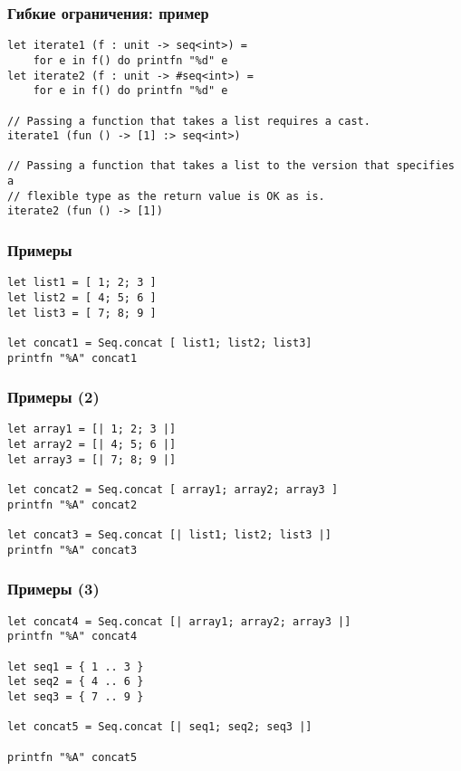 \documentclass{../../slides-style}
\begin{document}
    \begin{frame}[fragile]
        \frametitle{Гибкие ограничения: пример}
        \begin{verbatim}
let iterate1 (f : unit -> seq<int>) =
    for e in f() do printfn "%d" e
let iterate2 (f : unit -> #seq<int>) =
    for e in f() do printfn "%d" e

// Passing a function that takes a list requires a cast.
iterate1 (fun () -> [1] :> seq<int>)

// Passing a function that takes a list to the version that specifies a
// flexible type as the return value is OK as is.
iterate2 (fun () -> [1])
        \end{verbatim}
    \end{frame}

    \begin{frame}[fragile]
        \frametitle{Примеры}
        \begin{verbatim}
let list1 = [ 1; 2; 3 ]
let list2 = [ 4; 5; 6 ]
let list3 = [ 7; 8; 9 ]

let concat1 = Seq.concat [ list1; list2; list3]
printfn "%A" concat1
        \end{verbatim}
    \end{frame}

    \begin{frame}[fragile]
        \frametitle{Примеры (2)}
        \begin{verbatim}
let array1 = [| 1; 2; 3 |]
let array2 = [| 4; 5; 6 |]
let array3 = [| 7; 8; 9 |]

let concat2 = Seq.concat [ array1; array2; array3 ]
printfn "%A" concat2

let concat3 = Seq.concat [| list1; list2; list3 |]
printfn "%A" concat3
        \end{verbatim}
    \end{frame}

    \begin{frame}[fragile]
        \frametitle{Примеры (3)}
        \begin{verbatim}
let concat4 = Seq.concat [| array1; array2; array3 |]
printfn "%A" concat4

let seq1 = { 1 .. 3 }
let seq2 = { 4 .. 6 }
let seq3 = { 7 .. 9 }

let concat5 = Seq.concat [| seq1; seq2; seq3 |]

printfn "%A" concat5
        \end{verbatim}
    \end{frame}
\end{document}
